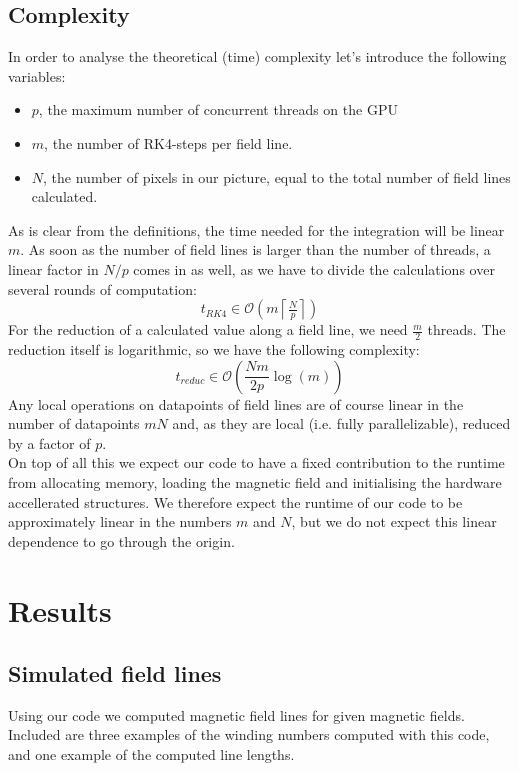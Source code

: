 \documentclass{article}
\renewcommand{\O}[1]{\ensuremath{\mathcal{O}\left(#1\right)}}
\begin{document}
\subsection{Complexity}
In order to analyse the theoretical (time) complexity let's introduce the following variables:
\begin{itemize}
	\item $p$, the maximum number of concurrent threads on the GPU
	\item $m$, the number of RK4-steps per field line.
	\item $N$, the number of pixels in our picture, equal to the total number of field lines calculated.
\end{itemize}
As is clear from the definitions, the time needed for the integration will be linear $m$. As soon as the number of field lines is larger than the number of threads, a linear factor in $N/p$ comes in as well, as we have to divide the calculations over several rounds of computation:
\[t_{RK4}\in\O{m\left\lceil\tfrac{N}{p}\right\rceil}\]
For the reduction of a calculated value along a field line, we need $\frac m2$ threads. The reduction itself is logarithmic, so we have the following complexity:
\[t_{reduc} \in \O{\frac{Nm}{2p}\log\left(m\right)} \]
Any local operations on datapoints of field lines are of course linear in the number of datapoints $mN$ and, as they are local (i.e. fully parallelizable), reduced by a factor of $p$.\\
On top of all this we expect our code to have a fixed contribution to the runtime from allocating memory, loading the magnetic field and initialising the hardware accellerated structures. We therefore expect the runtime of our code to be approximately linear in the numbers $m$ and $N$, but we do not expect this linear dependence to go through the origin.

\section{Results}
\subsection{Simulated field lines}
Using our code we computed magnetic field lines for given magnetic fields. Included are three examples of the winding numbers computed with this code, and one example of the computed line lengths.
\end{document}
